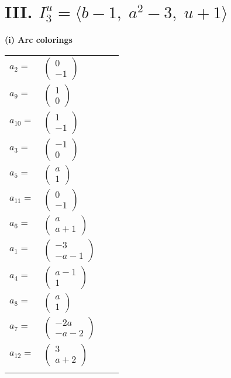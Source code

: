 \documentclass[1p]{elsarticle_modified}
\theoremstyle{definition}
\begin{document}
\centering \section*{III. $I^u_{3}= \langle b-1,\;a^2-3,\;u+1 \rangle$}
\flushleft \textbf{(i) Arc colorings}\\
\begin{tabular}{m{7pt} m{180pt} m{7pt} m{180pt} }
\flushright $a_{2}=$&$\begin{pmatrix}0\\-1\end{pmatrix}$ \\
\flushright $a_{9}=$&$\begin{pmatrix}1\\0\end{pmatrix}$ \\
\flushright $a_{10}=$&$\begin{pmatrix}1\\-1\end{pmatrix}$ \\
\flushright $a_{3}=$&$\begin{pmatrix}-1\\0\end{pmatrix}$ \\
\flushright $a_{5}=$&$\begin{pmatrix}a\\1\end{pmatrix}$ \\
\flushright $a_{11}=$&$\begin{pmatrix}0\\-1\end{pmatrix}$ \\
\flushright $a_{6}=$&$\begin{pmatrix}a\\a+1\end{pmatrix}$ \\
\flushright $a_{1}=$&$\begin{pmatrix}-3\\- a-1\end{pmatrix}$ \\
\flushright $a_{4}=$&$\begin{pmatrix}a-1\\1\end{pmatrix}$ \\
\flushright $a_{8}=$&$\begin{pmatrix}a\\1\end{pmatrix}$ \\
\flushright $a_{7}=$&$\begin{pmatrix}-2 a\\- a-2\end{pmatrix}$ \\
\flushright $a_{12}=$&$\begin{pmatrix}3\\a+2\end{pmatrix}$\\&\end{tabular}
\end{document}
